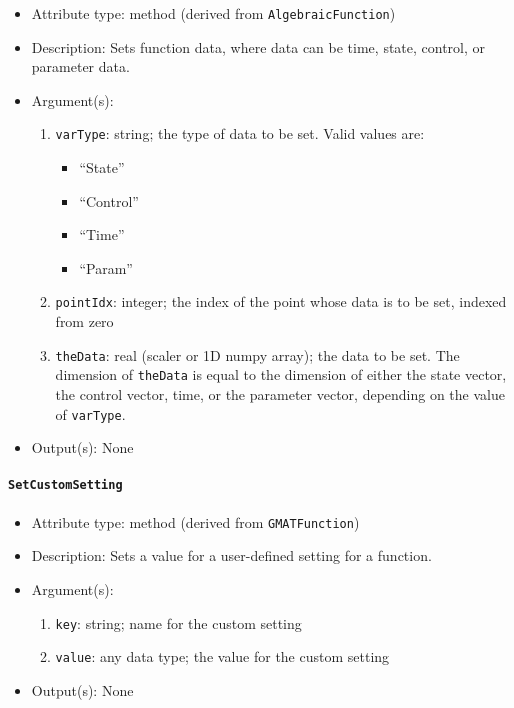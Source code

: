 \documentclass[]{article}
\begin{document}
\begin{itemize}
	\item Attribute type: method (derived from \texttt{AlgebraicFunction})
	\item Description: Sets function data, where data can be time, state, control, or parameter data.
	\item Argument(s):
	\begin{enumerate}
		\item \texttt{varType}: string; the type of data to be set. Valid values are:
		\begin{itemize}
			\item ``State''
			\item ``Control''
			\item ``Time''
			\item ``Param''
		\end{itemize} 
		\item \texttt{pointIdx}: integer; the index of the point whose data is to be set, indexed from zero
		\item \texttt{theData}: real (scaler or 1D numpy array); the data to be set. The dimension of \texttt{theData} is equal to the dimension of either the state vector, the control vector, time, or the parameter vector, depending on the value of \texttt{varType}.
	\end{enumerate}
	\item Output(s): None
\end{itemize}

\paragraph{\texttt{SetCustomSetting}}

\begin{itemize}
	\item Attribute type: method (derived from \texttt{GMATFunction})
	\item Description: Sets a value for a user-defined setting for a function.
	\item Argument(s):
	\begin{enumerate}
		\item \texttt{key}: string; name for the custom setting
		\item \texttt{value}: any data type; the value for the custom setting
	\end{enumerate}
	\item Output(s): None
\end{itemize}
\end{document}

